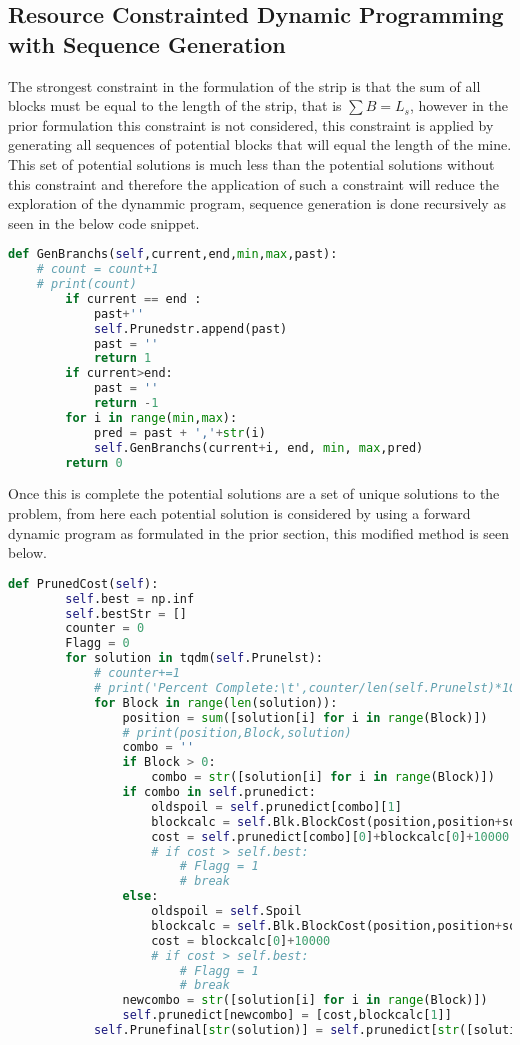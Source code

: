 \subsection{Resource Constrainted Dynamic Programming with Sequence Generation}
The strongest constraint in the formulation of the strip is that the sum of all blocks must be equal to the length of the strip, that is $\sum B = L_s$, however in the prior formulation this constraint is not considered, this constraint is applied by generating all sequences of potential blocks that will equal the length of the mine. This set of potential solutions is much less than the potential solutions without this constraint and therefore the application of such a constraint will reduce the exploration of the dynammic program, sequence generation is done recursively as seen in the below code snippet. 
\begin{lstlisting}[language = python]
def GenBranchs(self,current,end,min,max,past):
	# count = count+1
	# print(count)
		if current == end :
			past+''
			self.Prunedstr.append(past)
			past = ''
			return 1
		if current>end:
			past = ''
			return -1
		for i in range(min,max):
			pred = past + ','+str(i)
			self.GenBranchs(current+i, end, min, max,pred)
		return 0
\end{lstlisting}
Once this is complete the potential solutions are a set of unique solutions to the problem, from here each potential solution is considered by using a forward dynamic program as formulated in the prior section, this modified method is seen below. 
\begin{lstlisting}[language = python]
def PrunedCost(self):
		self.best = np.inf
		self.bestStr = []
		counter = 0
		Flagg = 0
		for solution in tqdm(self.Prunelst):
			# counter+=1
			# print('Percent Complete:\t',counter/len(self.Prunelst)*100,'%')
			for Block in range(len(solution)):
				position = sum([solution[i] for i in range(Block)])
				# print(position,Block,solution)
				combo = ''
				if Block > 0:
					combo = str([solution[i] for i in range(Block)])
				if combo in self.prunedict:
					oldspoil = self.prunedict[combo][1]
					blockcalc = self.Blk.BlockCost(position,position+solution[Block],oldspoil)
					cost = self.prunedict[combo][0]+blockcalc[0]+10000
					# if cost > self.best:
						# Flagg = 1
						# break
				else:
					oldspoil = self.Spoil
					blockcalc = self.Blk.BlockCost(position,position+solution[Block],oldspoil)
					cost = blockcalc[0]+10000
					# if cost > self.best:
						# Flagg = 1
						# break
				newcombo = str([solution[i] for i in range(Block)])
				self.prunedict[newcombo] = [cost,blockcalc[1]]
			self.Prunefinal[str(solution)] = self.prunedict[str([solution[i] for i in range(Block)])]

\end{lstlisting}
